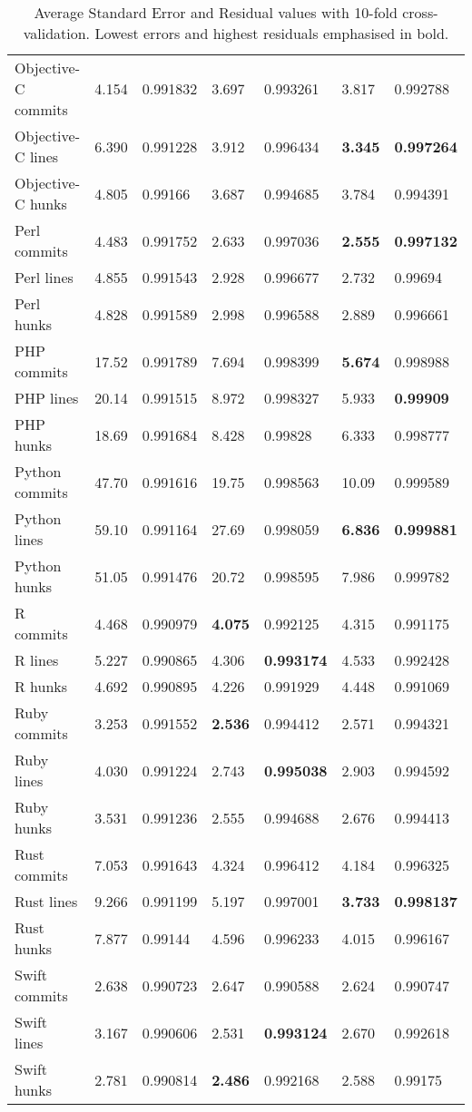 \documentclass[10pt,journal,compsoc]{IEEEtran}
\begin{document}
\begin{table*}[t!]
\begin{center}
\begin{tabular}{l | l l | l l | l l }
Objective-C commits & 4.154 & 0.991832 & 3.697 & 0.993261 & 3.817 & 0.992788 \\
Objective-C lines & 6.390 & 0.991228 & 3.912 & 0.996434 & {\bf 3.345} & {\bf 0.997264} \\
Objective-C hunks & 4.805 & 0.99166 & 3.687 & 0.994685 & 3.784 & 0.994391 \\ \hdashline
Perl commits & 4.483 & 0.991752 & 2.633 & 0.997036 & {\bf 2.555} & {\bf 0.997132} \\
Perl lines & 4.855 & 0.991543 & 2.928 & 0.996677 & 2.732 & 0.99694 \\
Perl hunks & 4.828 & 0.991589 & 2.998 & 0.996588 & 2.889 & 0.996661 \\ \hdashline
PHP commits & 17.52 & 0.991789 & 7.694 & 0.998399 & {\bf 5.674} & 0.998988 \\
PHP lines & 20.14 & 0.991515 & 8.972 & 0.998327 & 5.933 & {\bf 0.99909} \\
PHP hunks & 18.69 & 0.991684 & 8.428 & 0.99828 & 6.333 & 0.998777 \\ \hdashline
Python commits & 47.70 & 0.991616 & 19.75 & 0.998563 & 10.09 & 0.999589 \\
Python lines & 59.10 & 0.991164 & 27.69 & 0.998059 & {\bf 6.836} & {\bf 0.999881} \\
Python hunks & 51.05 & 0.991476 & 20.72 & 0.998595 & 7.986 & 0.999782 \\ \hdashline
R commits & 4.468 & 0.990979 & {\bf 4.075} & 0.992125 & 4.315 & 0.991175 \\
R lines & 5.227 & 0.990865 & 4.306 & {\bf 0.993174} & 4.533 & 0.992428 \\
R hunks & 4.692 & 0.990895 & 4.226 & 0.991929 & 4.448 & 0.991069 \\ \hdashline
Ruby commits & 3.253 & 0.991552 & {\bf 2.536} & 0.994412 & 2.571 & 0.994321 \\
Ruby lines & 4.030 & 0.991224 & 2.743 & {\bf 0.995038} & 2.903 & 0.994592 \\
Ruby hunks & 3.531 & 0.991236 & 2.555 & 0.994688 & 2.676 & 0.994413 \\ \hdashline
Rust commits & 7.053 & 0.991643 & 4.324 & 0.996412 & 4.184 & 0.996325 \\
Rust lines & 9.266 & 0.991199 & 5.197 & 0.997001 & {\bf 3.733} & {\bf 0.998137} \\
Rust hunks & 7.877 & 0.99144 & 4.596 & 0.996233 & 4.015 & 0.996167 \\ \hdashline
Swift commits & 2.638 & 0.990723 & 2.647 & 0.990588 & 2.624 & 0.990747 \\
Swift lines & 3.167 & 0.990606 & 2.531 & {\bf 0.993124} & 2.670 & 0.992618 \\
Swift hunks & 2.781 & 0.990814 & {\bf 2.486} & 0.992168 & 2.588 & 0.99175
\end{tabular}
\caption{\label{table:regression}Average Standard Error and Residual values with 10-fold cross-validation. Lowest errors and highest residuals emphasised in bold.}
\end{center}
\end{table*}
\end{document}
